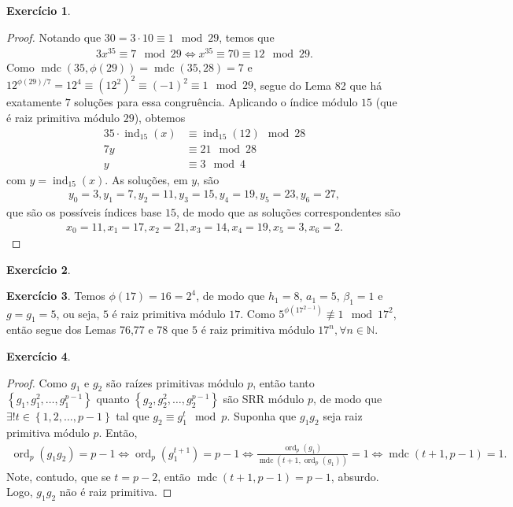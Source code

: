\documentclass[a4paper,12pt]{article}
\DeclareMathOperator{\mdc}{mdc}
\DeclareMathOperator{\ord}{ord}
\DeclareMathOperator{\ind}{ind}
\theoremstyle{definition}
\newtheorem{exercise}{Exercício}%
\begin{document}
	\begin{exercise}
		\begin{proof}
			Notando que $30 = 3\cdot 10\equiv 1\mod 29$, temos que
			\begin{align*}
			3x^{35}\equiv 7\mod 29 \Longleftrightarrow x^{35}\equiv 70\equiv 12\mod 29.
			\end{align*}
			Como $\mdc(35,\phi(29)) = \mdc(35,28) = 7$ e $12^{\phi(29)/7} = 12^{4} \equiv (12^2)^2\equiv (-1)^2\equiv 1\mod 29$, segue do Lema 82 que há exatamente $7$ soluções para essa congruência. Aplicando o índice módulo $15$ (que é raiz primitiva módulo $29$), obtemos
			\begin{align*}
			35\cdot\ind_{15}(x)&\equiv \ind_{15}(12)\mod 28 \\
			7y&\equiv 21\mod 28 \\
			y&\equiv 3\mod 4
			\end{align*}
			com $y = \ind_{15}(x)$. As soluções, em $y$, são
			\begin{align*}
			y_0 = 3, y_1 = 7, y_2 = 11, y_3 = 15, y_4 = 19, y_5 = 23, y_6 = 27,
			\end{align*} 
			que são os possíveis índices base $15$, de modo que as soluções correspondentes são
			\begin{align*}
			x_0 = 11, x_1 = 17, x_2 = 21, x_3 = 14, x_4 = 19, x_5 = 3, x_6 = 2.
			\end{align*} 
		\end{proof}
	\end{exercise}

	\begin{exercise}
		
	\end{exercise}

	\begin{exercise}
		Temos $\phi(17) = 16 = 2^4$, de modo que $h_1 = 8$, $a_1 = 5$, $\beta_1 = 1$ e $g = g_1 = 5$, ou seja, $5$ é raiz primitiva módulo $17$. Como $5^{\phi(17^{2-1})}\not\equiv 1\mod 17^2$, então segue dos Lemas 76,77 e 78 que $5$ é raiz primitiva módulo $17^n,\forall n\in\mathbb{N}$.
	\end{exercise}

	\begin{exercise}
		\begin{proof}
			Como $g_1$ e $g_2$ são raízes primitivas módulo $p$, então tanto $\left\{ g_1,g_1^2, \dots, g_1^{p-1} \right\}$ quanto $\left\{ g_2, g_2^2, \dots, g_2^{p-1} \right\}$ são SRR módulo $p$, de modo que $\exists! t\in\left\{ 1,2,\dots,p-1 \right\}$ tal que $g_2\equiv g_1^t\mod p$. Suponha que $g_1g_2$ seja raiz primitiva módulo $p$. Então,
			\begin{align*}
			\ord_p(g_1g_2) = p-1 \Leftrightarrow \ord_p(g_1^{t+1}) = p-1 \Leftrightarrow \frac{\ord_p(g_1)}{\mdc(t+1,\ord_p(g_1))} = 1 \Leftrightarrow \mdc(t+1,p-1) = 1.
			\end{align*}
			Note, contudo, que se $t=p-2$, então $\mdc(t+1,p-1) = p-1$, absurdo. Logo, $g_1g_2$ não é raiz primitiva.
		\end{proof}
	\end{exercise}
\end{document}
